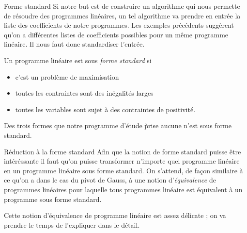 \documentclass[aspectratio = 169]{beamer}
\begin{document}
\begin{frame}{Forme standard}
  Si notre but est de construire un algorithme qui nous permette de
  r\'esoudre des programmes lin\'eaires, un tel algorithme va prendre
  en entr\'ee la liste des coefficients de notre programmes. Les
  exemples pr\'ec\'edents sugg\`erent qu'on a diff\'erentes listes de
  coefficients possibles pour un m\^eme programme lin\'eaire. Il nous
  faut donc standardiser l'entr\'ee.
  \begin{defn}
    Un programme lin\'eaire est sous \emph{forme standard} si
    \begin{itemize}
    \item[\textbullet] c'est un probl\`eme de maximisation
    \item[\textbullet] toutes les contraintes sont des in\'egalit\'es larges
    \item[\textbullet] toutes les variables sont sujet \`a des
      contraintes de positivit\'e.
    \end{itemize}
  \end{defn}
  Des trois formes que notre programme d'\'etude \` prise aucune n'est
  sous forme standard.
\end{frame}

\begin{frame}{R\'eduction \`a la forme standard}
  Afin que la notion de forme standard puisse \^etre int\'er\'essante
  il faut qu'on puisse transformer n'importe quel programme lin\'eaire
  en un programme lin\'eaire sous forme standard. On s'attend, de
  fa\c{c}on similaire \`a ce qu'on a dans le cas du pivot de Gauss,
  \`a une notion d'\emph{\'equivalence} de programmes lin\'eaires pour
  laquelle tous programmes lin\'eaire est \'equivalent \`a un
  programme sous forme standard.


  Cette notion d'\'equivalence de programme lin\'eaire est assez
  d\'elicate ; on va prendre le temps de l'expliquer dans le d\'etail.
\end{frame}
\end{document}
